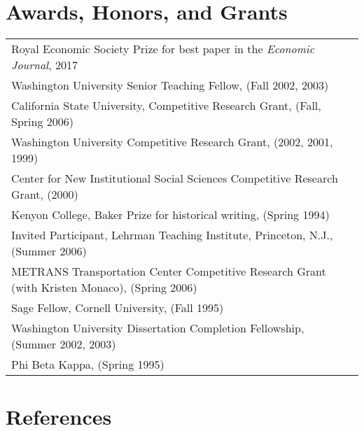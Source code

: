 \documentclass[11pt,fullpage]{article}
\begin{document}
\section*{Awards, Honors, and Grants}

\begin{tabular}{ll}
	Royal Economic Society Prize for best paper in the \textit{Economic Journal}, 2017 \\
	Washington University Senior Teaching Fellow, (Fall 2002, 2003) \\
	California State University, Competitive Research Grant, (Fall, Spring 2006) \\
	Washington University Competitive Research Grant, (2002, 2001, 1999) \\
	Center for New Institutional Social Sciences Competitive Research Grant, (2000) \\
	Kenyon College, Baker Prize for historical writing, (Spring 1994) \\
	Invited Participant, Lehrman Teaching Institute, Princeton, N.J., (Summer 2006) \\
	METRANS Transportation Center Competitive Research Grant (with Kristen Monaco), (Spring 2006) \\
	Sage Fellow, Cornell University, (Fall 1995) \\
	Washington University Dissertation Completion Fellowship, (Summer 2002, 2003) \\
	Phi Beta Kappa, (Spring 1995)	\\
\end{tabular}	


\vspace{.25cm}


\section*{References}
\end{document}
